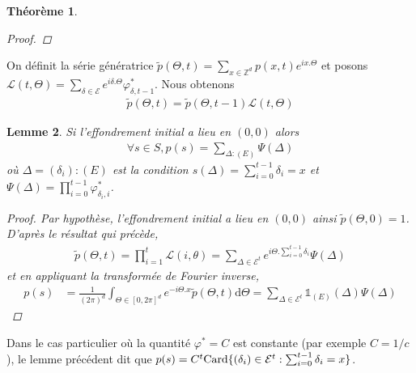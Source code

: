 \documentclass{article}
\newtheorem{theorem}{Théorème}[section]
\newtheorem{lemma}[theorem]{Lemme}
\begin{document}
\begin{theorem}
\begin{proof}
					 \end{proof}
\end{theorem}

On définit la série génératrice $\tilde{p}(\Theta, t) = \sum_{x\in \mathbb{Z}^d}p(x,t)e^{i x.\Theta}$ et posons $\mathcal{L}(t,\Theta)= \sum_{\delta\in \mathcal{E}} e^{i\delta.\Theta}\varphi^*_{\delta,t-1}$. Nous obtenons 
\begin{align*}
	\tilde{p}(\Theta, t) = \tilde{p}(\Theta, t-1)\mathcal{L}(t,\Theta)
\end{align*}
\begin{lemma}
	Si l'effondrement initial a lieu en $(0,0)$ alors
	\begin{align*}
		\forall s\in S, p(s) = \sum_{\Delta : (E)}  \Psi(\Delta)
	\end{align*}
	où $\Delta = (\delta_i) : (E)$ est la condition $s(\Delta) = \sum_{i=0}^{t-1}\delta_{i} = x$ et $\Psi(\Delta) = \prod_{i=0}^{t-1}\varphi^*_{\delta_i,i}$.
	\begin{proof}
		Par hypothèse, l'effondrement initial a lieu en $(0,0)$ ainsi $\tilde{p}(\Theta, 0) = 1$. D'après le résultat qui précède, 
		\begin{align*} \tilde{p}(\Theta, t) = \prod_{i=1}^{t}\mathcal{L}(i,\theta) = \sum_{\Delta\in \mathcal{E}^{t}} e^{i\Theta.\sum_{i=0}^{t-1} \delta_i}\Psi(\Delta)\end{align*}
			et en appliquant la transformée de Fourier inverse, 
			\begin{align*}
				p(s) &= \frac{1}{(2\pi)^d}\int_{\Theta\in [0,2\pi]^d} e^{-i\Theta.x} \tilde{p}(\Theta, t)\mathrm{d}\Theta = \sum_{\Delta \in \mathcal{E}^t} \mathds{1}_{(E)}(\Delta)\Psi(\Delta)
		\end{align*} 
	\end{proof}\end{lemma}
	Dans le cas particulier où la quantité $\varphi^*=C$ est constante (par exemple $C= 1/c$), le lemme précédent dit que $p(s) = C^t\textup{Card}\{(\delta_i)\in \mathcal{E}^t : \sum_{i=0}^{t-1}\delta_i=x\}$. %
\end{document}

